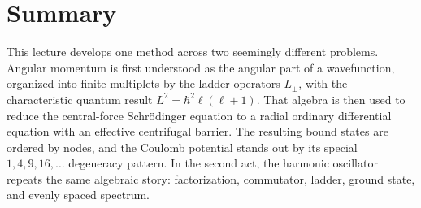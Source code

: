 \section{Summary}

This lecture develops one method across two seemingly different problems. Angular momentum is first understood as the angular part of a wavefunction, organized into finite multiplets by the ladder operators \(L_\pm\), with the characteristic quantum result \(L^2=\hbar^2\ell(\ell+1)\). That algebra is then used to reduce the central-force Schr\"odinger equation to a radial ordinary differential equation with an effective centrifugal barrier. The resulting bound states are ordered by nodes, and the Coulomb potential stands out by its special \(1,4,9,16,\dots\) degeneracy pattern. In the second act, the harmonic oscillator repeats the same algebraic story: factorization, commutator, ladder, ground state, and evenly spaced spectrum.